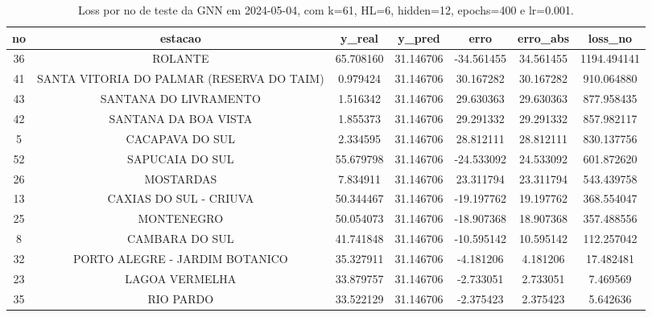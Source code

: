 \begin{table}[h]
\centering
\caption{Loss por no de teste da GNN em 2024-05-04, com k=61, HL=6, hidden=12, epochs=400 e lr=0.001.}
\label{tab:gnn_loss_k61_hl6_h12_e400_d20240504}
\begin{tabular}{ccccccc}
\toprule
no & estacao & y\_real & y\_pred & erro & erro\_abs & loss\_no \\
\midrule
36 & ROLANTE & 65.708160 & 31.146706 & -34.561455 & 34.561455 & 1194.494141 \\
41 & SANTA VITORIA DO PALMAR (RESERVA DO TAIM) & 0.979424 & 31.146706 & 30.167282 & 30.167282 & 910.064880 \\
43 & SANTANA DO LIVRAMENTO & 1.516342 & 31.146706 & 29.630363 & 29.630363 & 877.958435 \\
42 & SANTANA DA BOA VISTA & 1.855373 & 31.146706 & 29.291332 & 29.291332 & 857.982117 \\
5 & CACAPAVA DO SUL & 2.334595 & 31.146706 & 28.812111 & 28.812111 & 830.137756 \\
52 & SAPUCAIA DO SUL & 55.679798 & 31.146706 & -24.533092 & 24.533092 & 601.872620 \\
26 & MOSTARDAS & 7.834911 & 31.146706 & 23.311794 & 23.311794 & 543.439758 \\
13 & CAXIAS DO SUL - CRIUVA & 50.344467 & 31.146706 & -19.197762 & 19.197762 & 368.554047 \\
25 & MONTENEGRO & 50.054073 & 31.146706 & -18.907368 & 18.907368 & 357.488556 \\
8 & CAMBARA DO SUL & 41.741848 & 31.146706 & -10.595142 & 10.595142 & 112.257042 \\
32 & PORTO ALEGRE - JARDIM BOTANICO & 35.327911 & 31.146706 & -4.181206 & 4.181206 & 17.482481 \\
23 & LAGOA VERMELHA & 33.879757 & 31.146706 & -2.733051 & 2.733051 & 7.469569 \\
35 & RIO PARDO & 33.522129 & 31.146706 & -2.375423 & 2.375423 & 5.642636 \\
\bottomrule
\end{tabular}
\end{table}
